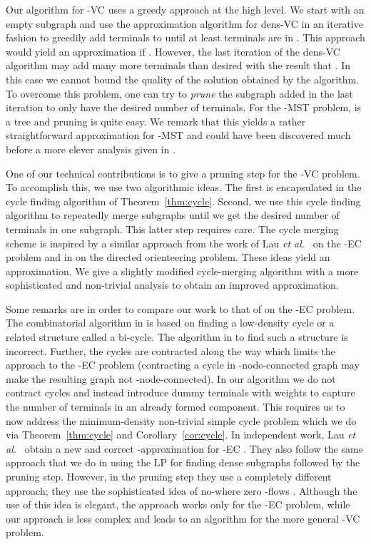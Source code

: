 \documentclass[11pt]{article}
\newcommand{\etal}{{\em et al.}\ }
\newcommand{\kec}[1]{-{\sc EC} }
\newcommand{\kvc}[1]{-{\sc VC} }
\newcommand{\ke}{\kec{2}}
\newcommand{\kv}{\kvc{2}}
\newcommand{\densV}{dens-{\sc VC} }
\begin{document}
Our algorithm for \kv uses a greedy approach at the high level. We
start with an empty subgraph  and use the approximation algorithm
for \densV in an iterative fashion to greedily add terminals to 
until at least  terminals are in . This approach would
yield an  approximation if . However,
the last iteration of the \densV algorithm may add many more terminals
than desired with the result that . In this case we cannot
bound the quality of the solution obtained by the algorithm.  To
overcome this problem, one can try to {\em prune} the subgraph 
added in the last iteration to only have the desired number of
terminals. For the -MST problem,  is a tree and pruning is
quite easy. We remark that this yields a rather straightforward
 approximation for -MST and could have been
discovered much before a more clever analysis given in
\cite{AwerbuchABV95}.

One of our technical contributions is to give a pruning step for the
\kv problem. To accomplish this, we use two algorithmic ideas. The
first is encapsulated in the cycle finding algorithm of
Theorem~\ref{thm:cycle}.  Second, we use this cycle finding algorithm
to repeatedly merge subgraphs until we get the desired number of
terminals in one subgraph. This latter step requires care. The cycle
merging scheme is inspired by a similar approach from the work of Lau
\etal \cite{LauNSS07} on the \ke problem and in \cite{ChekuriKP08} on
the directed orienteering problem. These ideas yield an  approximation. We give a slightly modified
cycle-merging algorithm with a more sophisticated and non-trivial
analysis to obtain an improved 
approximation.

Some remarks are in order to compare our work to that of
\cite{LauNSS07} on the \ke problem. The combinatorial algorithm in
\cite{LauNSS07} is based on finding a low-density
cycle or a related structure called a bi-cycle. The algorithm in
\cite{LauNSS07} to find such a structure is incorrect.  Further, the
cycles are contracted along the way which limits the approach to the
\ke problem (contracting a cycle in -node-connected graph may make
the resulting graph not -node-connected).  In our algorithm we do
not contract cycles and instead introduce dummy terminals with weights
to capture the number of terminals in an already formed component.
This requires us to now address the minimum-density non-trivial simple
cycle problem which we do via Theorem~\ref{thm:cycle} and
Corollary~\ref{cor:cycle}. In independent work, Lau \etal
\cite{LauNSS07b} obtain a new and correct -approximation for \ke.  They also follow the same approach that we
do in using the LP for finding dense subgraphs followed by the pruning
step.  However, in the pruning step they use a completely different
approach; they use the sophisticated idea of no-where zero -flows
\cite{Seymour}. Although the use of this idea is elegant, the approach
works only for the \ke problem, while our approach is less complex
and leads to an algorithm for the more general \kv problem.
\end{document}
